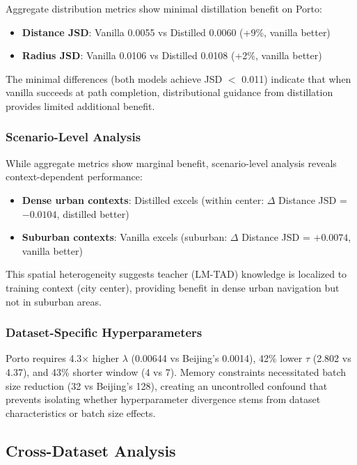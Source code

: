 Aggregate distribution metrics show minimal distillation benefit on Porto:
\begin{itemize}[leftmargin=*,noitemsep]
    \item \textbf{Distance JSD}: Vanilla 0.0055 vs Distilled 0.0060 (+9\%, vanilla better)
    \item \textbf{Radius JSD}: Vanilla 0.0106 vs Distilled 0.0108 (+2\%, vanilla better)
\end{itemize}

The minimal differences (both models achieve JSD $<$ 0.011) indicate that when vanilla succeeds at path completion, distributional guidance from distillation provides limited additional benefit.

\subsubsection{Scenario-Level Analysis}

While aggregate metrics show marginal benefit, scenario-level analysis reveals context-dependent performance:
\begin{itemize}[leftmargin=*,noitemsep]
    \item \textbf{Dense urban contexts}: Distilled excels (within center: $\Delta$ Distance JSD = $-0.0104$, distilled better)
    \item \textbf{Suburban contexts}: Vanilla excels (suburban: $\Delta$ Distance JSD = $+0.0074$, vanilla better)
\end{itemize}

This spatial heterogeneity suggests teacher (LM-TAD) knowledge is localized to training context (city center), providing benefit in dense urban navigation but not in suburban areas.

\subsubsection{Dataset-Specific Hyperparameters}

Porto requires 4.3$\times$ higher $\lambda$ (0.00644 vs Beijing's 0.0014), 42\% lower $\tau$ (2.802 vs 4.37), and 43\% shorter window (4 vs 7). Memory constraints necessitated batch size reduction (32 vs Beijing's 128), creating an uncontrolled confound that prevents isolating whether hyperparameter divergence stems from dataset characteristics or batch size effects.

\subsection{Cross-Dataset Analysis}
\label{sec:eval-cross}

